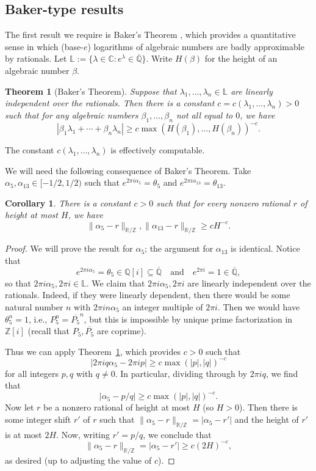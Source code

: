 \documentclass[11pt]{amsart}
\newtheorem{theorem}[lemma]{Theorem}
\newtheorem{corollary}[lemma]{Corollary}
\theoremstyle{definition}
\begin{document}
\subsection{Baker-type results}\label{sec:baker}
The first result we require is Baker's Theorem \cite{Baker1, Baker2, Baker3}, which provides a quantitative sense in which (base-$e$) logarithms of algebraic numbers are badly approximable by rationals.  Let $\mathbb{L}:=\{\lambda \in \mathbb{C}: e^\lambda \in \overline{\mathbb{Q}}\}$.  Write $H(\beta)$ for the height of an algebraic number $\beta$.

\begin{theorem}[Baker's Theorem]\label{thm:baker}
Suppose that $\lambda_1, \ldots, \lambda_n \in \mathbb{L}$ are linearly independent over the rationals.  Then there is a constant $c=c(\lambda_1, \ldots, \lambda_n)>0$ such that for any algebraic numbers $\beta_1, \ldots, \beta_n$ not all equal to $0$, we have
$$|\beta_1 \lambda_1+\cdots+\beta_n \lambda_n| \geq c\max(H(\beta_1), \ldots, H(\beta_n))^{-c}.$$
\end{theorem}
The constant $c(\lambda_1, \ldots, \lambda_n)$ is effectively computable.

We will need the following consequence of Baker's Theorem.  Take $\alpha_5,\alpha_{13} \in [-1/2,1/2)$ such that $e^{2\pi i \alpha_5}=\theta_5$ and $e^{2\pi i \alpha_{13}}=\theta_{13}$.

\begin{corollary}\label{cor:baker}
There is a constant $c>0$ such that for every nonzero rational $r$ of height at most $H$, we have
$$\|\alpha_5 - r\|_{\mathbb{R}/\mathbb{Z}}, \|\alpha_{13} - r\|_{\mathbb{R}/\mathbb{Z}} \ge cH^{-c}.$$
\end{corollary}

\begin{proof}
We will prove the result for $\alpha_5$; the argument for $\alpha_{13}$ is identical.  Notice that $$e^{2\pi i \alpha_5}=\theta_5 \in \mathbb{Q}[i] \subseteq \overline{\mathbb{Q}} \quad \text{and} \quad e^{2\pi i}=1 \in \overline{\mathbb{Q}},$$ so that $2\pi i \alpha_5, 2\pi i \in \mathbb{L}$.  We claim that $2\pi i \alpha_5, 2\pi i$ are linearly independent over the rationals.  Indeed, if they were linearly dependent, then there would be some natural number $n$ with $2\pi i n \alpha_5$ an integer multiple of $2\pi i$.  Then we would have $\theta_5^n=1$, i.e., $P_5^n=\overline{P_5}^n$, but this is impossible by unique prime factorization in $\mathbb{Z}[i]$ (recall that $P_5, \overline{P_5}$ are coprime).

Thus we can apply Theorem~\ref{thm:baker}, which provides $c>0$ such that
$$|2\pi i q \alpha_5 -2\pi i p| \geq c\max(|p|,|q|)^{-c}$$
for all integers $p,q$ with $q \neq 0$.  In particular, dividing through by $2\pi i q$, we find that
$$|\alpha_5-p/q| \geq c\max(|p|,|q|)^{-c}.$$
Now let $r$ be a nonzero rational of height at most $H$ (so $H>0$).  Then there is some integer shift $r'$ of $r$ such that $\|\alpha_5-r\|_{\mathbb{R}/\mathbb{Z}}=|\alpha_5-r'|$ and the height of $r'$ is at most $2H$.  Now, writing $r'=p/q$, we conclude that
$$\|\alpha_5-r\|_{\mathbb{R}/\mathbb{Z}}=|\alpha_5-r'| \geq c(2H)^{-c},$$
as desired (up to adjusting the value of $c$).
\end{proof}
\end{document}

